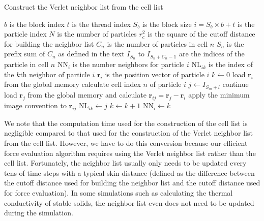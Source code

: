 \documentclass[12pt,a4paper]{report}
\newcommand{\vect}[1]{\boldsymbol{#1}}
\begin{document}
\begin{algorithm}[htb]
\caption{Construct the Verlet neighbor list from the cell list}
\label{algorithm:convert}
\begin{algorithmic}[1]
\Require $b$ is the block index
\Require $t$ is the thread index
\Require $S_b$ is the block size
\Require $i=S_b\times b+t$ is the particle index
\Require $N$ is the number of particles
\Require $r_c^2$ is the square of the cutoff distance for building the neighbor list
\Require $C_n$ is the number of particles in cell $n$
\Require $S_n$ is the prefix sum of $C_n$ as defined in the text
\Require $I_{S_n}$ to $I_{S_n + C_n - 1}$ are the indices of the particle in cell $n$
\Require NN$_{i}$ is the number neighbors for particle $i$
\Require NL$_{ik}$ is the index of the $k$th neighbor of particle $i$
\Require $\vect{r}_{i}$ is the position vector of particle $i$
\State $k\leftarrow 0$
    \State load $\vect{r}_{i}$ from the global memory
    \State calculate cell index $n$ of particle $i$
            \State $j \leftarrow I_{S_m + l} $
                \State continue
            \EndIf
            \State load $\vect{r}_{j}$ from the global memory and calculate
               $\vect{r}_{ij} = \vect{r}_{j} - \vect{r}_{i}$
            \State apply the minimum image convention to $\vect{r}_{ij}$
            \If {$|\vect{r}_{ij}|^2 < r_c^2$}
                \State NL$_{ik}\leftarrow j$
                \State $k\leftarrow k+1$
            \EndIf
        \EndFor
        \State NN$_{i}\leftarrow k$
    \EndFor
\EndIf
 \end{algorithmic}
\end{algorithm}

We note that the computation time used for the construction of the cell list is negligible compared to that used for the construction of the Verlet neighbor list from the cell list. However, we have to do this conversion because our efficient force evaluation algorithm \cite{fan2017cpc} requires using the Verlet neighbor list rather than the cell list. Fortunately, the neighbor list usually only needs to be updated every tens of time steps with a typical skin distance (defined as the difference between the cutoff distance used for building the neighbor list and the cutoff distance used for force evaluation). In some simulations such as calculating the thermal conductivity of stable solids, the neighbor list even does not need to be updated during the simulation.
\end{document}
